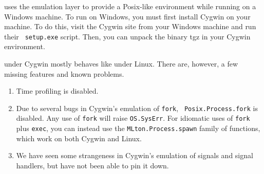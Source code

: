 
{\mlton} uses the  emulation
layer to provide a Posix-like environment while running on a Windows machine.
To run {\mlton} on Windows, you must first install Cygwin on your machine.  To
do this, visit the Cygwin site from your Windows machine and run their {\tt
setup.exe} script.  Then, you can unpack the {\mlton} binary tgz in your Cygwin
environment.

{\mlton} under Cygwin mostly behaves like {\mlton} under Linux.  There are,
however, a few missing features and known problems.

\begin{enumerate}

\item Time profiling is disabled.

\item Due to several bugs in Cygwin's emulation of {\tt fork}, {\tt
Posix.Process.fork} is disabled.  Any use of {\tt fork} will raise
{\tt OS.SysErr}.  For idiomatic uses of {\tt fork} plus {\tt exec},
you can instead use the {\tt MLton.Process.spawn} family of functions, which
work on both Cygwin and Linux.

\item We have seen some strangeness in Cygwin's emulation of signals and
signal handlers, but have not been able to pin it down.

\end{enumerate}


